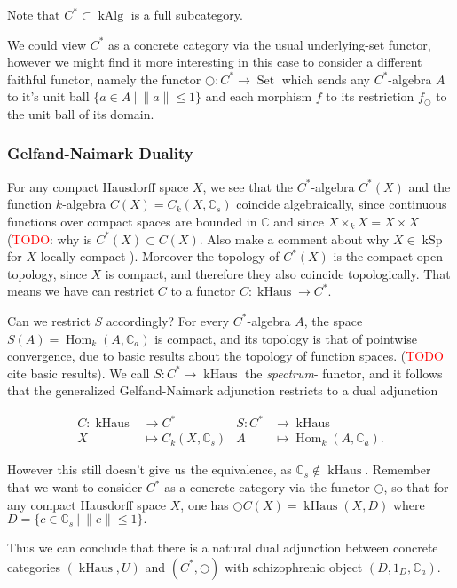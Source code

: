 \documentclass[12pt,a4paper]{article}
\DeclareMathOperator{\Hom}{Hom}
\DeclareMathOperator{\Set}{Set}
\DeclareMathOperator{\kSp}{kSp}
\DeclareMathOperator{\kHaus}{kHaus}
\DeclareMathOperator{\kAlg}{kAlg}
\begin{document}
Note that $C^* \subset \kAlg$ is a full subcategory.

 We could view $C^*$ as a concrete category via the usual underlying-set functor, however we might find it more interesting in this case to consider a different faithful functor, namely the functor $\bigcirc: C^* \to \Set$ which sends any $C^*$-algebra $A$ to it's unit ball $\{ a \in A \  \lvert  \ \lVert a \lVert \leq 1\}$ and each morphism $f$  to its restriction $f_\bigcirc$ to the unit ball of its domain.
 
 \subsubsection{Gelfand-Naimark Duality}
 
 For any compact Hausdorff space $X$, we see that the $C^*$-algebra $C^*(X)$ and the function $k$-algebra $C(X) = C_k(X, \mathbb{C}_s)$ coincide algebraically, since continuous functions over compact spaces are bounded in $\mathbb{C}$ and since $X \times_k X = X \times X$ (\textcolor{red}{TODO}: why  is $C^*(X) \subset C(X)$. Also make a comment about why $X \in \kSp$ for $X$ locally compact ). Moreover the topology of $C^*(X)$ is the compact open topology, since $X$ is compact, and therefore they also coincide topologically. That means we have can restrict $C$ to a functor $C: \kHaus \to C^*$.
 
 Can we restrict $S$ accordingly? For every $C^*$-algebra $A$, the space $S(A) = \Hom_k(A, \mathbb{C}_a)$ is compact, and its topology is that of pointwise convergence, due to basic results about the topology of function spaces. (\textcolor{red}{TODO} cite basic results). We call $S: C^* \to \kHaus$ the \emph{spectrum}- functor, and it follows that the generalized Gelfand-Naimark adjunction restricts to a dual adjunction
 
 \begin{align*}
	C: \kHaus & \to C^* &  S: C^* & \to \kHaus\\
	X &\mapsto C_k(X, \mathbb{C}_s) & A &\mapsto \Hom_k(A, \mathbb{C}_a).
\end{align*}
 
 However this still doesn't give us the equivalence, as $\mathbb{C}_s \notin \kHaus$. Remember that we want to consider $C^*$ as a concrete category via the functor $\bigcirc$, so that for any compact Hausdorff space $X$, one has $\bigcirc C(X) = \kHaus(X, D)$ where $D = \{ c \in \mathbb{C}_s \ \lvert \ \lVert c \lVert \leq 1 \}. $
 
 Thus we can conclude that there is a natural dual adjunction between concrete categories $(\kHaus, U)$ and $(C^*, \bigcirc)$ with schizophrenic object $(D, 1_D, \mathbb{C}_a)$. 
 
\end{document}
